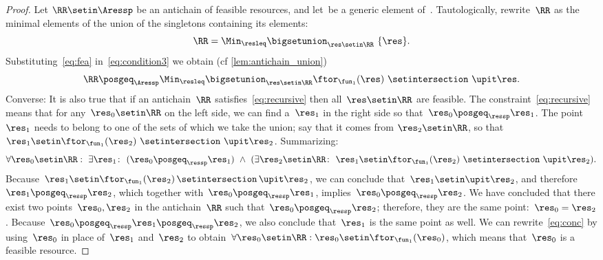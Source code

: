 \begin{proof}
    Let $\RR\setin\Aressp$ be an antichain of feasible resources, and let~\res be a generic element of~\ressp.
    Tautologically, rewrite~$\RR$ as the minimal elements of the union of the singletons containing its elements:
    \begin{equation}
        \RR=\Min_{\resleq}\bigsetunion_{\res\setin\RR}\ \{\res\}.
        \label{eq:condition3}
    \end{equation}
    Substituting~\cref{eq:fea} in~\cref{eq:condition3} we obtain (cf
    \cref{lem:antichain_union})
    \begin{equation}
        \RR\posgeq_{\Aressp}\Min_{\resleq}\bigsetunion_{\res\setin\RR}\ftor_{\fun_{1}}(\res)\ \setintersection\ \upit\res.
        \label{eq:recursive}
    \end{equation}
    Converse: It is also true that if an antichain~$\RR$ satisfies~\cref{eq:recursive} then all~$\res\setin\RR$ are feasible.
    The constraint~\cref{eq:recursive} means that for any~$\res_{0}\setin\RR$ on the left side, we can find a~$\res_{1}$ in the right side so that~$\res_{0}\posgeq_{\ressp}\res_{1}$.
    The point~$\res_{1}$ needs to belong to one of the sets of which we take the union; say that it comes from $\res_{2}\setin\RR$, so that $\res_{1}\setin\ftor_{\fun_{1}}(\res_{2})\ \setintersection\ \upit\res_{2}$.
    Summarizing:
    \begin{equation}
        \forall\res_{0}\setin\RR:\ \exists\res_{1}\colon\ (\res_{0}\posgeq_{\ressp}\res_{1})\ \wedge\ (\exists\res_{2}\setin\RR\colon\ \res_{1}\setin\ftor_{\fun_{1}}(\res_{2})\ \setintersection\ \upit\res_{2}).
        \label{eq:conc}
    \end{equation}
    Because~$\res_{1}\setin\ftor_{\fun_{1}}(\res_{2})\,\setintersection\,\upit\res_{2}$, we can conclude that~$\res_{1}\setin\upit\res_{2}$, and therefore~$\res_{1}\posgeq_{\ressp}\res_{2}$, which together with~$\res_{0}\posgeq_{\ressp}\res_{1}$, implies~$\res_{0}\posgeq_{\ressp}\res_{2}$.
    We have concluded that there exist two points~$\res_{0},\res_{2}$ in the antichain~$\RR$ such that~$\res_{0}\posgeq_{\ressp}\res_{2}$; therefore, they are the same point:~$\res_{0}=\res_{2}$.
    Because~$\res_{0}\posgeq_{\ressp}\res_{1}\posgeq_{\ressp}\res_{2}$, we also conclude that~$\res_{1}$ is the same point as well.
    We can rewrite~\cref{eq:conc} by using~$\res_{0}$ in place of~$\res_{1}$ and~$\res_{2}$ to obtain~$\forall\res_{0}\setin\RR:\res_{0}\setin\ftor_{\fun_{1}}(\res_{0})$,
    which means that~$\res_{0}$ is a feasible resource.


\end{proof}
